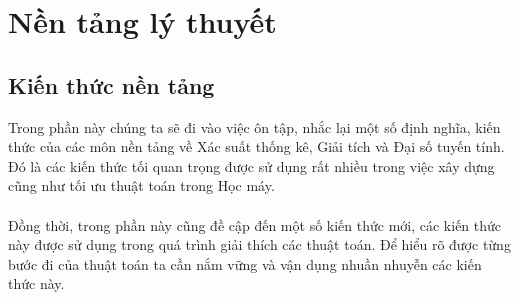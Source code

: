 \chapter{Nền tảng lý thuyết}
\section{Kiến thức nền tảng}
Trong phần này chúng ta sẽ đi vào việc ôn tập, nhắc lại một số định nghĩa, kiến
thức của các môn nền tảng về Xác suất thống kê, Giải tích và Đại số tuyến tính.
Đó là các kiến thức tối quan trọng được sử dụng rất nhiều trong việc xây dựng
cũng như tối ưu thuật toán trong Học máy. \\\\  
Đồng thời, trong phần này cũng đề cập đến một số kiến thức mới, các kiến thức
này được sử dụng trong quá trình giải thích các thuật toán. Để hiểu rõ được
từng bước đi của thuật toán ta cần nắm vững và vận dụng nhuần nhuyễn các kiến
thức này.

